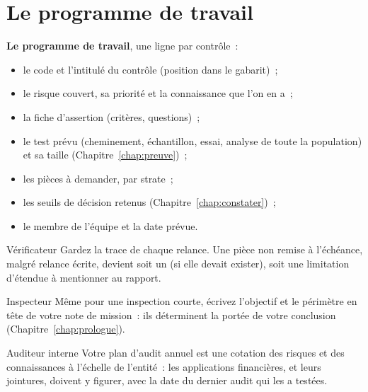 \separateur

\section{Le programme de travail}
\label{sec:c06-programme}

\begin{boxprocedure}
\textbf{Le programme de travail}, une ligne par contrôle~:
\begin{itemize}
    \item le code et l'intitulé du contrôle (position dans le gabarit)~;
    \item le risque couvert, sa priorité et la connaissance que l'on en a~;
    \item la fiche d'assertion (critères, questions)~;
    \item le test prévu (cheminement, échantillon, essai, analyse de toute
          la population) et sa taille (Chapitre~\ref{chap:preuve})~;
    \item les pièces à demander, par strate~;
    \item les seuils de décision retenus (Chapitre~\ref{chap:constater})~;
    \item le membre de l'équipe et la date prévue.
\end{itemize}
\end{boxprocedure}

\begin{boxmetier}{Vérificateur}
Gardez la trace de chaque relance. Une pièce non remise à l'échéance,
malgré relance écrite, devient soit un \NON{} (si elle devait exister),
soit une limitation d'étendue à mentionner au rapport.
\end{boxmetier}

\begin{boxmetier}{Inspecteur}
Même pour une inspection courte, écrivez l'objectif et le périmètre en
tête de votre note de mission~: ils déterminent la portée de votre
conclusion (Chapitre~\ref{chap:prologue}).
\end{boxmetier}

\begin{boxmetier}{Auditeur interne}
Votre plan d'audit annuel est une cotation des risques et des
connaissances à l'échelle de l'entité~: les applications financières, et
leurs jointures, doivent y figurer, avec la date du dernier audit qui les
a testées.
\end{boxmetier}

